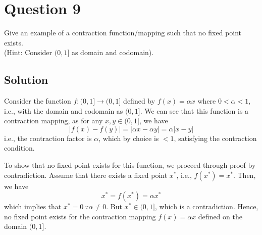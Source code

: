 \section*{Question 9}\label{sec:q9}

Give an example of a contraction function/mapping such that no fixed point exists. \\
(Hint: Consider \( (0,1] \) as domain and codomain).

\subsection*{Solution}

Consider the function \( f: (0,1] \to (0,1] \) defined by \( f(x) = \alpha x \) where \( 0 < \alpha < 1 \), i.e., with the domain and codomain as \( (0,1] \).
We can see that this function is a contraction mapping, as for any \( x, y \in (0,1] \), we have
\[
    \vert f(x) - f(y) \vert = \left\vert \alpha x - \alpha y \right\vert = \alpha \vert x - y \vert
\]
i.e., the contraction factor is \( \alpha \), which by choice is \( < 1 \), satisfying the contraction condition.

To show that no fixed point exists for this function, we proceed through proof by contradiction.
Assume that there exists a fixed point \( x^* \), i.e., \( f(x^*) = x^* \).
Then, we have
\[
    x^* = f(x^*) = \alpha x^*
\]
which implies that \( x^* = 0 \ \because \alpha \neq 0 \).
But \( x^* \in (0,1] \), which is a contradiction.
Hence, no fixed point exists for the contraction mapping \( f(x) = \alpha x \) defined on the domain \( (0,1] \).

